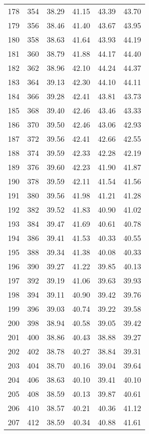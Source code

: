 \begin{longtable}{rrllll}
		178 & 354 & 38.29 & 41.15 & 43.39 & 43.70 \\ 
		179 & 356 & 38.46 & 41.40 & 43.67 & 43.95 \\ 
		180 & 358 & 38.63 & 41.64 & 43.93 & 44.19 \\ 
		181 & 360 & 38.79 & 41.88 & 44.17 & 44.40 \\ 
		182 & 362 & 38.96 & 42.10 & 44.24 & 44.37 \\ 
		183 & 364 & 39.13 & 42.30 & 44.10 & 44.11 \\ 
		184 & 366 & 39.28 & 42.41 & 43.81 & 43.73 \\ 
		185 & 368 & 39.40 & 42.46 & 43.46 & 43.33 \\ 
		186 & 370 & 39.50 & 42.46 & 43.06 & 42.93 \\ 
		187 & 372 & 39.56 & 42.41 & 42.66 & 42.55 \\ 
		188 & 374 & 39.59 & 42.33 & 42.28 & 42.19 \\ 
		189 & 376 & 39.60 & 42.23 & 41.90 & 41.87 \\ 
		190 & 378 & 39.59 & 42.11 & 41.54 & 41.56 \\ 
		191 & 380 & 39.56 & 41.98 & 41.21 & 41.28 \\ 
		192 & 382 & 39.52 & 41.83 & 40.90 & 41.02 \\ 
		193 & 384 & 39.47 & 41.69 & 40.61 & 40.78 \\ 
		194 & 386 & 39.41 & 41.53 & 40.33 & 40.55 \\ 
		195 & 388 & 39.34 & 41.38 & 40.08 & 40.33 \\ 
		196 & 390 & 39.27 & 41.22 & 39.85 & 40.13 \\ 
		197 & 392 & 39.19 & 41.06 & 39.63 & 39.93 \\ 
		198 & 394 & 39.11 & 40.90 & 39.42 & 39.76 \\ 
		199 & 396 & 39.03 & 40.74 & 39.22 & 39.58 \\ 
		200 & 398 & 38.94 & 40.58 & 39.05 & 39.42 \\ 
		201 & 400 & 38.86 & 40.43 & 38.88 & 39.27 \\ 
		202 & 402 & 38.78 & 40.27 & 38.84 & 39.31 \\ 
		203 & 404 & 38.70 & 40.16 & 39.04 & 39.64 \\ 
		204 & 406 & 38.63 & 40.10 & 39.41 & 40.10 \\ 
		205 & 408 & 38.59 & 40.13 & 39.87 & 40.61 \\ 
		206 & 410 & 38.57 & 40.21 & 40.36 & 41.12 \\ 
		207 & 412 & 38.59 & 40.34 & 40.88 & 41.61 \\ 

\end{longtable}
